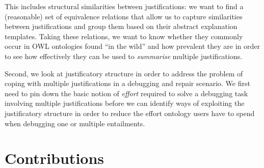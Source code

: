 This includes structural similarities between justifications: we want to find a (reasonable) set of equivalence relations that allow us to capture similarities between justifications and group them based on their abstract explanation templates. Taking these relations, we want to know whether they commonly occur in OWL ontologies found \enquote{in the wild} and how prevalent they are in order to see how effectively they can be used to \emph{summarise} multiple justifications.

Second, we look at justificatory structure in order to address the problem of coping with multiple justifications in a debugging and repair scenario. We first need to pin down the basic notion of \emph{effort} required to solve a debugging task involving multiple justifications before we can identify ways of exploiting the justificatory structure in order to reduce the effort ontology users have to spend when debugging one or multiple entailments.


\section{Contributions}

